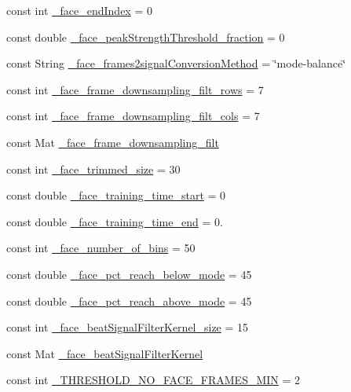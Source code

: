 \begin{DoxyCompactItemize}
\item 
const int \hyperlink{namespace_m_h_r_ad45b2867da1e1b69dee3648585a3ad3a}{\+\_\+face\+\_\+end\+Index} = 0
\item 
const double \hyperlink{namespace_m_h_r_adad3be408f5b45234ee745acc33d6ac8}{\+\_\+face\+\_\+peak\+Strength\+Threshold\+\_\+fraction} = 0
\item 
const String \hyperlink{namespace_m_h_r_a634c25b34e7aa6bbb3cfc346964d2f90}{\+\_\+face\+\_\+frames2signal\+Conversion\+Method} = \char`\"{}mode-\/balance\char`\"{}
\item 
const int \hyperlink{namespace_m_h_r_a7fa6df2df062c81344149450be58164a}{\+\_\+face\+\_\+frame\+\_\+downsampling\+\_\+filt\+\_\+rows} = 7
\item 
const int \hyperlink{namespace_m_h_r_ae762029528d214f277ed064282784d3b}{\+\_\+face\+\_\+frame\+\_\+downsampling\+\_\+filt\+\_\+cols} = 7
\item 
const Mat \hyperlink{namespace_m_h_r_a53c978f9017a65e09546b90474f17111}{\+\_\+face\+\_\+frame\+\_\+downsampling\+\_\+filt}
\item 
const int \hyperlink{namespace_m_h_r_ae64aacd3f078b0c1ecfefee56c27e3ce}{\+\_\+face\+\_\+trimmed\+\_\+size} = 30
\item 
const double \hyperlink{namespace_m_h_r_a4ad71fd0cc039551252ae1929fbbfea9}{\+\_\+face\+\_\+training\+\_\+time\+\_\+start} = 0
\item 
const double \hyperlink{namespace_m_h_r_a86e77ed79df316c170e425d131558571}{\+\_\+face\+\_\+training\+\_\+time\+\_\+end} = 0.
\item 
const int \hyperlink{namespace_m_h_r_a2c4c769eba572cf1388059c68e02804a}{\+\_\+face\+\_\+number\+\_\+of\+\_\+bins} = 50
\item 
const double \hyperlink{namespace_m_h_r_ac4235bc51ec51e261f5822920a5886b0}{\+\_\+face\+\_\+pct\+\_\+reach\+\_\+below\+\_\+mode} = 45
\item 
const double \hyperlink{namespace_m_h_r_a50b60319fb33591915a63ce9b618a18c}{\+\_\+face\+\_\+pct\+\_\+reach\+\_\+above\+\_\+mode} = 45
\item 
const int \hyperlink{namespace_m_h_r_a7f9a1a070d8e2c3eb72d79c71b2f468a}{\+\_\+face\+\_\+beat\+Signal\+Filter\+Kernel\+\_\+size} = 15
\item 
const Mat \hyperlink{namespace_m_h_r_a846528ce2187823d06b73caadf751570}{\+\_\+face\+\_\+beat\+Signal\+Filter\+Kernel}
\item 
const int \hyperlink{namespace_m_h_r_adc786b108805d8d2ad944595ea2b7092}{\+\_\+\+T\+H\+R\+E\+S\+H\+O\+L\+D\+\_\+\+N\+O\+\_\+\+F\+A\+C\+E\+\_\+\+F\+R\+A\+M\+E\+S\+\_\+\+M\+I\+N} = 2

\end{DoxyCompactItemize}
